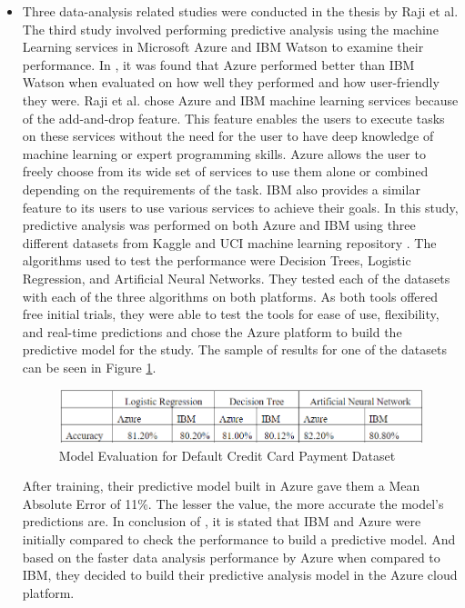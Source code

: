 \begin{itemize}
    \item Three data-analysis related studies were conducted in the thesis \cite{raji2018digital} by Raji et al. The third study involved performing predictive analysis using the machine Learning services in Microsoft Azure and \acs{IBM} Watson to examine their performance. In \cite{raji2018digital}, it was found that Azure performed better than \acs{IBM} Watson when evaluated on how well they performed and how user-friendly they were. Raji et al. chose Azure and \acs{IBM} machine learning services because of the add-and-drop feature. This feature enables the users to execute tasks on these services without the need for the user to have deep knowledge of machine learning or expert programming skills. Azure allows the user to freely choose from its wide set of services to use them alone or combined depending on the requirements of the task. \acs{IBM} also provides a similar feature to its users to use various services to achieve their goals. In this study\cite{raji2018digital}, predictive analysis was performed on both Azure and \acs{IBM} using three different datasets from Kaggle\cite{kaggle} and \acs{UCI} machine learning repository \cite{uciml}.
    The algorithms used to test the performance were Decision Trees, Logistic Regression, and Artificial Neural Networks. They tested each of the datasets with each of the three algorithms on both platforms. As both tools offered free initial trials, they were able to test the tools for ease of use, flexibility, and real-time predictions and chose the Azure platform to build the predictive model for the study. The sample of results for one of the datasets can be seen in Figure \ref{similar_work_results}.
    \begin {figure}[ht]
    \centering
    \includegraphics[scale=0.77]{images/Chapter2/similar_work.png}
    \caption{Model Evaluation for Default Credit Card Payment Dataset}
    \label{similar_work_results}
    \end {figure}
    After training, their predictive model built in Azure gave them a Mean Absolute Error of 11\%. The lesser the value, the more accurate the model's predictions are. In conclusion of \cite{raji2018digital}, it is stated that \acs{IBM} and Azure were initially compared to check the performance to build a predictive model. And based on the faster data analysis performance by Azure when compared to \acs{IBM}, they decided to build their predictive analysis model in the Azure cloud platform. 
    

\end{itemize}
